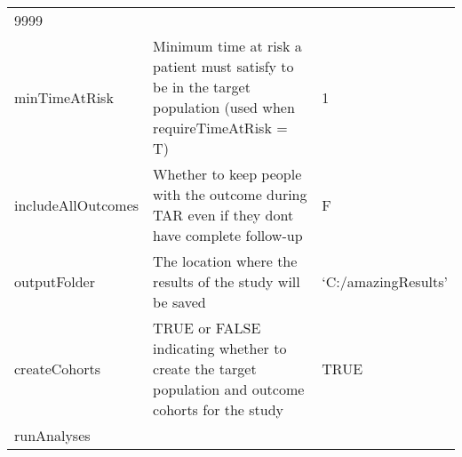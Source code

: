 \documentclass[
]{article}
\begin{document}
\begin{longtable}[]{@{}lll@{}}
\begin{minipage}[t]{0.24\columnwidth}
9999\strut
\end{minipage}\tabularnewline
\begin{minipage}[t]{0.21\columnwidth}\raggedright
minTimeAtRisk\strut
\end{minipage} & \begin{minipage}[t]{0.46\columnwidth}\raggedright
Minimum time at risk a patient must satisfy to be in the target
population (used when requireTimeAtRisk = T)\strut
\end{minipage} & \begin{minipage}[t]{0.24\columnwidth}\raggedright
1\strut
\end{minipage}\tabularnewline
\begin{minipage}[t]{0.21\columnwidth}\raggedright
includeAllOutcomes\strut
\end{minipage} & \begin{minipage}[t]{0.46\columnwidth}\raggedright
Whether to keep people with the outcome during TAR even if they dont
have complete follow-up\strut
\end{minipage} & \begin{minipage}[t]{0.24\columnwidth}\raggedright
F\strut
\end{minipage}\tabularnewline
\begin{minipage}[t]{0.21\columnwidth}\raggedright
outputFolder\strut
\end{minipage} & \begin{minipage}[t]{0.46\columnwidth}\raggedright
The location where the results of the study will be saved\strut
\end{minipage} & \begin{minipage}[t]{0.24\columnwidth}\raggedright
`C:/amazingResults'\strut
\end{minipage}\tabularnewline
\begin{minipage}[t]{0.21\columnwidth}\raggedright
createCohorts\strut
\end{minipage} & \begin{minipage}[t]{0.46\columnwidth}\raggedright
TRUE or FALSE indicating whether to create the target population and
outcome cohorts for the study\strut
\end{minipage} & \begin{minipage}[t]{0.24\columnwidth}\raggedright
TRUE\strut
\end{minipage}\tabularnewline
\begin{minipage}[t]{0.21\columnwidth}\raggedright
runAnalyses\strut
\end{minipage} & \begin{minipage}[t]{0.46\columnwidth}\raggedright

\end{minipage}
\end{longtable}
\end{document}
